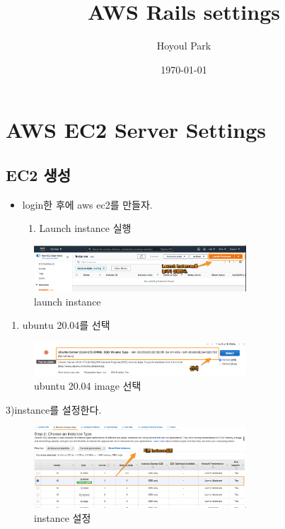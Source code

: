 \documentclass[11pt]{article}
\author{Hoyoul Park}
\date{\today}
\title{AWS Rails settings}
\begin{document}
\maketitle
\tableofcontents

\section{AWS EC2 Server Settings}
\label{sec:org006825f}
\subsection{EC2 생성}
\label{sec:org190e6f6}
\begin{itemize}
\item login한 후에 aws ec2를 만들자.
\begin{enumerate}
\item Launch instance 실행
\end{enumerate}
\end{itemize}
\begin{figure}[htbp]
\centering
\includegraphics[width=300px]{./img/launchinstance.png}
\caption{\label{fig:orgc3043b0}launch instance}
\end{figure}

\begin{enumerate}
\item ubuntu 20.04를 선택
\end{enumerate}
\begin{figure}[htbp]
\centering
\includegraphics[width=300px]{./img/ubuntu.png}
\caption{\label{fig:org07167e9}ubuntu 20.04 image 선택}
\end{figure}

3)instance를 설정한다.
\begin{figure}[htbp]
\centering
\includegraphics[width=300px]{./img/instance.png}
\caption{\label{fig:org40f3ec7}instance 설정}
\end{figure}
\end{document}
